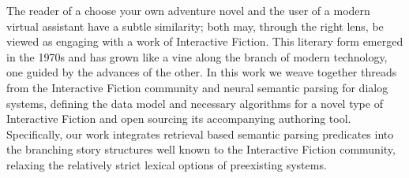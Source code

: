The reader of a choose your own adventure novel and the user of a modern virtual assistant have a subtle similarity; both may, through the right lens, be viewed as engaging with a work of Interactive Fiction.  This literary form emerged in the 1970s and has grown like a vine along the branch of modern technology, one guided by the advances of the other.  In this work we weave together threads from the Interactive Fiction community and neural semantic parsing for dialog systems, defining the data model and necessary algorithms for a novel type of Interactive Fiction and open sourcing its accompanying authoring tool.  Specifically, our work integrates retrieval based semantic parsing predicates into the branching story structures well known to the Interactive Fiction community, relaxing the relatively strict lexical options of preexisting systems.
